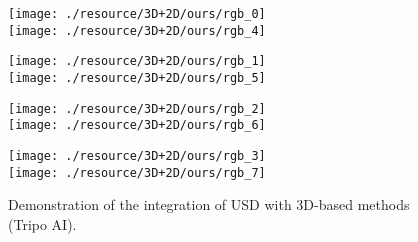 \begin{figure*}[t!]
\begin{minipage}[USD with control]{0.49\linewidth}
{\begin{minipage}[c]{0.25\linewidth}
                \texttt{[image: ./resource/3D+2D/ours/rgb\_0]}\vspace{-1.mm}\\
                \texttt{[image: ./resource/3D+2D/ours/rgb\_4]}
            \end{minipage}\hspace{-1.mm}
            \begin{minipage}[c]{0.25\linewidth}
                \texttt{[image: ./resource/3D+2D/ours/rgb\_1]}\vspace{-1.mm}\\
                \texttt{[image: ./resource/3D+2D/ours/rgb\_5]}
            \end{minipage}\hspace{-1.mm}
            \begin{minipage}[c]{0.25\linewidth}
                \texttt{[image: ./resource/3D+2D/ours/rgb\_2]}\vspace{-1.mm}\\
                \texttt{[image: ./resource/3D+2D/ours/rgb\_6]}
            \end{minipage}\hspace{-1.mm}
            \begin{minipage}[c]{0.25\linewidth}
                \texttt{[image: ./resource/3D+2D/ours/rgb\_3]}\vspace{-1.mm}\\
                \texttt{[image: ./resource/3D+2D/ours/rgb\_7]}
            \end{minipage}\hspace{-1.mm}
        }
    \end{minipage}
    \caption{Demonstration of the integration of USD with 3D-based methods (Tripo AI).}
    \label{fig:app_demo_future}
\end{figure*}





